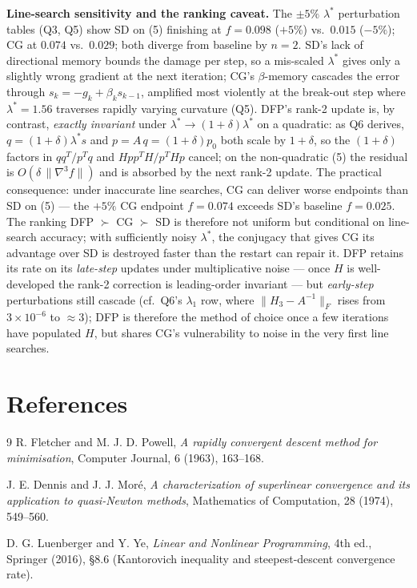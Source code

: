 \documentclass[11pt,a4paper]{article}
\begin{document}
\textbf{Line-search sensitivity and the ranking caveat.}
The \(\pm 5\%\) \(\lambda^{\ast}\) perturbation tables (Q3, Q5) show SD on (5) finishing at \(f=0.098\) (\(+5\%\)) vs.\ \(0.015\) (\(-5\%\)); CG at \(0.074\) vs.\ \(0.029\); both diverge from baseline by \(n=2\). SD's lack of directional memory bounds the damage per step, so a mis-scaled \(\lambda^{\ast}\) gives only a slightly wrong gradient at the next iteration; CG's \(\beta\)-memory cascades the error through \(s_{k}=-g_{k}+\beta_{k}s_{k-1}\), amplified most violently at the break-out step where \(\lambda^{\ast}=1.56\) traverses rapidly varying curvature (Q5). DFP's rank-2 update is, by contrast, \emph{exactly invariant} under \(\lambda^{\ast}\!\to\!(1+\delta)\lambda^{\ast}\) on a quadratic: as Q6 derives, \(q=(1+\delta)\lambda^{\ast}s\) and \(p=A\,q=(1+\delta)p_{0}\) both scale by \(1+\delta\), so the \((1+\delta)\) factors in \(qq^{T}\!/p^{T}q\) and \(Hpp^{T}\!H/p^{T}\!Hp\) cancel; on the non-quadratic (5) the residual is \(O(\delta\,\|\nabla^{3}f\|)\) and is absorbed by the next rank-2 update. The practical consequence: under inaccurate line searches, CG can deliver worse endpoints than SD on (5) --- the \(+5\%\) CG endpoint \(f=0.074\) exceeds SD's baseline \(f=0.025\). The ranking DFP \(\succ\) CG \(\succ\) SD is therefore not uniform but conditional on line-search accuracy; with sufficiently noisy \(\lambda^{\ast}\), the conjugacy that gives CG its advantage over SD is destroyed faster than the restart can repair it. DFP retains its rate on its \emph{late-step} updates under multiplicative noise --- once \(H\) is well-developed the rank-2 correction is leading-order invariant --- but \emph{early-step} perturbations still cascade (cf.\ Q6's \(\lambda_{1}\) row, where \(\|H_{3}-A^{-1}\|_{F}\) rises from \(3\!\times\!10^{-6}\) to \(\approx 3\)); DFP is therefore the method of choice once a few iterations have populated \(H\), but shares CG's vulnerability to noise in the very first line searches.

\section*{References}

\begin{thebibliography}{9}
R. Fletcher and M. J. D. Powell, \emph{A rapidly convergent descent method for minimisation},
Computer Journal, 6 (1963), 163--168.

J. E. Dennis and J. J. Mor\'e, \emph{A characterization of superlinear convergence and its application to quasi-Newton methods},
Mathematics of Computation, 28 (1974), 549--560.

D. G. Luenberger and Y. Ye, \emph{Linear and Nonlinear Programming},
4th ed., Springer (2016), \S 8.6 (Kantorovich inequality and steepest-descent convergence rate).
\end{thebibliography}
\end{document}
